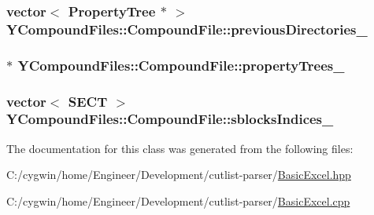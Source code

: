 \subsubsection[{previous\+Directories\+\_\+}]{\setlength{\rightskip}{0pt plus 5cm}vector$<$ {\bf Property\+Tree} $\ast$ $>$ Y\+Compound\+Files\+::\+Compound\+File\+::previous\+Directories\+\_\+\hspace{0.3cm}{\ttfamily [protected]}}\label{class_y_compound_files_1_1_compound_file_a92ceca9cbadff5ef76f39993ae6da46b}
\hypertarget{class_y_compound_files_1_1_compound_file_a79debb22852a2e6b16c94b51d2a00df7}{}
\subsubsection[{property\+Trees\+\_\+}]{ $\ast$ Y\+Compound\+Files\+::\+Compound\+File\+::property\+Trees\+\_\+\hspace{0.3cm}{\ttfamily [protected]}}\label{class_y_compound_files_1_1_compound_file_a79debb22852a2e6b16c94b51d2a00df7}
\hypertarget{class_y_compound_files_1_1_compound_file_a772ab9d0acb2963d17f5d33ddb2bc3dc}{}
\subsubsection[{sblocks\+Indices\+\_\+}]{\setlength{\rightskip}{0pt plus 5cm}vector$<$ {\bf S\+E\+C\+T} $>$ Y\+Compound\+Files\+::\+Compound\+File\+::sblocks\+Indices\+\_\+\hspace{0.3cm}{\ttfamily [protected]}}\label{class_y_compound_files_1_1_compound_file_a772ab9d0acb2963d17f5d33ddb2bc3dc}


The documentation for this class was generated from the following files\+:\begin{DoxyCompactItemize}
\item 
C\+:/cygwin/home/\+Engineer/\+Development/cutlist-\/parser/\hyperlink{_basic_excel_8hpp}{Basic\+Excel.\+hpp}\item 
C\+:/cygwin/home/\+Engineer/\+Development/cutlist-\/parser/\hyperlink{_basic_excel_8cpp}{Basic\+Excel.\+cpp}\end{DoxyCompactItemize}
